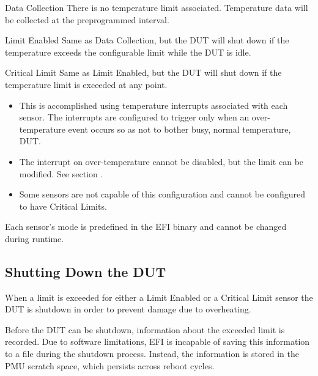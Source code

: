 \begin{Definition}

	\item[Data Collection] There is no temperature limit associated.
	Temperature data will be collected at the preprogrammed interval.
		
	\item[Limit Enabled] Same as Data Collection, but the DUT will shut
	down if the temperature exceeds the configurable limit while the DUT
	is idle.

	\item[Critical Limit] Same as Limit Enabled, but the DUT will shut
	down if the temperature limit is exceeded at any point.

	\begin{itemize}

		\item This is accomplished using temperature interrupts
		associated with each sensor. The interrupts are configured to
		trigger only when an over-temperature event occurs so as not
		to bother busy, normal temperature, DUT.

		\item The interrupt on over-temperature cannot be disabled, but
        the limit can be modified. See section .

		\item Some sensors are not capable of this configuration and
		cannot be configured to have Critical Limits.

	\end{itemize}

\end{Definition}

Each sensor's mode is predefined in the EFI binary and cannot be changed during runtime.

\subsection{Shutting Down the DUT}
\label{sec:ShuttingDownTheDut}

When a limit is exceeded for either a Limit Enabled or a Critical Limit sensor
the DUT is shutdown in order to prevent damage due to overheating.

Before the DUT can be shutdown, information about the exceeded limit is
recorded.  Due to software limitations, EFI is incapable of saving this
information to a file during the shutdown process. Instead, the information is
stored in the PMU scratch space, which persists across reboot cycles.

